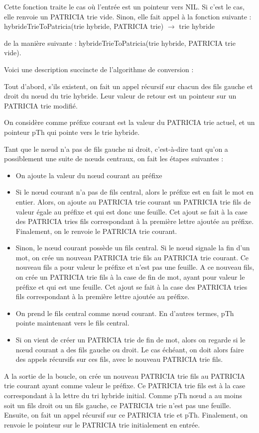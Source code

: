 \documentclass[a4paper,12pt]{report}
\begin{document}
Cette fonction traite le cas où l'entrée est un pointeur vers NIL.
Si c'est le cas, elle renvoie un PATRICIA trie vide. Sinon, elle fait appel à la fonction suivante :
hybrideTrieToPatricia(trie hybride, PATRICIA trie) $\rightarrow$ trie hybride

de la manière suivante : hybrideTrieToPatricia(trie hybride, PATRICIA trie vide).

Voici une description succincte de l'algorithme de conversion :

Tout d'abord, s'ils existent, on fait un appel récursif sur chacun des fils gauche et droit du nœud du trie hybride. Leur valeur de retour est un pointeur sur un PATRICIA trie modifié.

On considère comme préfixe courant est la valeur du PATRICIA trie actuel, et un pointeur pTh qui pointe vers le trie hybride.

Tant que le nœud n'a pas de fils gauche ni droit, c'est-à-dire tant qu'on a possiblement une suite de nœuds centraux, on fait les étapes suivantes :
\begin{itemize}
\item On ajoute la valeur du nœud courant au préfixe
\item Si le nœud courant n'a pas de fils central, alors le préfixe est en fait le mot en entier. Alors, on ajoute au PATRICIA trie courant un PATRICIA trie fils de valeur égale au préfixe et qui est donc une feuille. Cet ajout se fait à la case des PATRICIA tries fils correspondant à la première lettre ajoutée au préfixe. Finalement, on le renvoie le PATRICIA trie courant.
\item Sinon, le nœud courant possède un fils central.
Si le nœud signale la fin d'un mot, on crée un nouveau PATRICIA trie fils au PATRICIA trie courant. Ce nouveau fils a pour valeur le préfixe et n'est pas une feuille. A ce nouveau fils, on crée un PATRICIA trie fils à la case de fin de  mot, ayant pour valeur le préfixe et qui est une feuille. Cet ajout se fait à la case des PATRICIA tries fils correspondant à la première lettre ajoutée au préfixe.
\item On prend le fils central comme nœud courant. En d'autres termes, pTh pointe maintenant vers le fils central. 
\item Si on vient de créer un PATRICIA trie de fin de mot, alors on regarde si le nœud courant a des fils gauche ou droit. Le cas échéant, on doit alors faire des appels récursifs sur ces fils, avec le nouveau PATRICIA trie fils.
\end{itemize}
A la sortie de la boucle, on crée un nouveau PATRICIA trie fils au PATRICIA trie courant ayant comme valeur le préfixe. Ce PATRICIA trie fils est à la case correspondant à la lettre du tri hybride initial. Comme pTh nœud a au moins soit un fils droit ou un fils gauche, ce PATRICIA trie n'est pas une feuille. Ensuite, on fait un appel récursif sur ce PATRICIA trie et pTh.
Finalement, on renvoie le pointeur sur le PATRICIA trie initialement en entrée.
\end{document}
